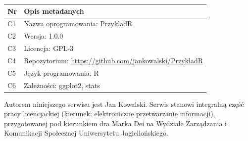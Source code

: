 \documentclass[stronyinfo]{epi-praca}
\begin{document}
\bibliografia

\spisilustracji

\indeksnazwisk

\aneksy


\begin{tabular}{@{}ll@{}}
\toprule
Nr & Opis metadanych \\
\midrule
C1 & Nazwa oprogramowania: PrzykladR \\
C2 & Wersja: 1.0.0 \\
C3 & Licencja: GPL-3 \\
C4 & Repozytorium: \url{https://github.com/jankowalski/PrzykladR} \\
C5 & Język programowania: R \\
C6 & Zależności: ggplot2, stats \\
\bottomrule
\end{tabular}


Autorem niniejszego serwisu jest Jan Kowalski. Serwis stanowi integralną część pracy licencjackiej (kierunek: elektroniczne przetwarzanie informacji), przygotowanej pod kierunkiem dra Marka Dei na Wydziale Zarządzania i Komunikacji Społecznej Uniwersytetu Jagiellońskiego.
\end{document}
